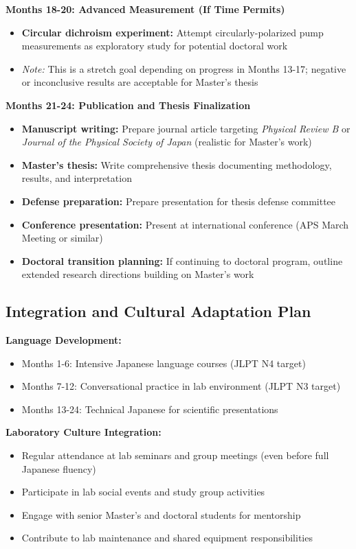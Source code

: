 \documentclass[12pt,a4paper]{article}
\begin{document}
\textbf{Months 18-20: Advanced Measurement (If Time Permits)}
\begin{itemize}
    \item \textbf{Circular dichroism experiment:} Attempt circularly-polarized pump measurements as exploratory study for potential doctoral work
    \item \textit{Note:} This is a stretch goal depending on progress in Months 13-17; negative or inconclusive results are acceptable for Master's thesis
\end{itemize}

\textbf{Months 21-24: Publication and Thesis Finalization}
\begin{itemize}
    \item \textbf{Manuscript writing:} Prepare journal article targeting \textit{Physical Review B} or \textit{Journal of the Physical Society of Japan} (realistic for Master's work)
    \item \textbf{Master's thesis:} Write comprehensive thesis documenting methodology, results, and interpretation
    \item \textbf{Defense preparation:} Prepare presentation for thesis defense committee
    \item \textbf{Conference presentation:} Present at international conference (APS March Meeting or similar)
    \item \textbf{Doctoral transition planning:} If continuing to doctoral program, outline extended research directions building on Master's work
\end{itemize}

\subsection{Integration and Cultural Adaptation Plan}

\textbf{Language Development:}
\begin{itemize}
    \item Months 1-6: Intensive Japanese language courses (JLPT N4 target)
    \item Months 7-12: Conversational practice in lab environment (JLPT N3 target)
    \item Months 13-24: Technical Japanese for scientific presentations
\end{itemize}

\textbf{Laboratory Culture Integration:}
\begin{itemize}
    \item Regular attendance at lab seminars and group meetings (even before full Japanese fluency)
    \item Participate in lab social events and study group activities
    \item Engage with senior Master's and doctoral students for mentorship
    \item Contribute to lab maintenance and shared equipment responsibilities
\end{itemize}
\end{document}
